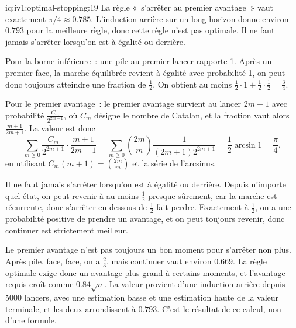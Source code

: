 \begin{solution}{iq:iv1:optimal-stopping:19}
La règle «~s'arrêter au premier avantage~» vaut exactement $\pi/4 \approx 0.785$. L'induction arrière sur un long horizon donne environ $0.793$ pour la meilleure règle, donc cette règle n'est pas optimale. Il ne faut jamais s'arrêter lorsqu'on est à égalité ou derrière.

Pour la borne inférieure~: une pile au premier lancer rapporte 1. Après un premier face, la marche équilibrée revient à égalité avec probabilité 1, on peut donc toujours atteindre une fraction de $\tfrac12$. On obtient au moins $\tfrac12 \cdot 1 + \tfrac12 \cdot \tfrac12 = \tfrac34$.

Pour le premier avantage~: le premier avantage survient au lancer $2m + 1$ avec probabilité $\frac{C_m}{2^{2m + 1}}$, où $C_m$ désigne le nombre de Catalan, et la fraction vaut alors $\frac{m + 1}{2m + 1}$. La valeur est donc
\[
\sum_{m \ge 0} \frac{C_m}{2^{2m + 1}} \cdot \frac{m + 1}{2m + 1} = \sum_{m \ge 0} \binom{2m}{m}\frac{1}{(2m + 1)2^{2m + 1}} = \frac12 \arcsin 1 = \frac{\pi}{4},
\]
en utilisant $C_m(m + 1) = \binom{2m}{m}$ et la série de l'arcsinus.

Il ne faut jamais s'arrêter lorsqu'on est à égalité ou derrière. Depuis n'importe quel état, on peut revenir à au moins $\tfrac12$ presque sûrement, car la marche est récurrente, donc s'arrêter en dessous de $\tfrac12$ fait perdre. Exactement à $\tfrac12$, on a une probabilité positive de prendre un avantage, et on peut toujours revenir, donc continuer est strictement meilleur.

Le premier avantage n'est pas toujours un bon moment pour s'arrêter non plus. Après pile, face, face, on a $\tfrac23$, mais continuer vaut environ $0.669$. La règle optimale exige donc un avantage plus grand à certains moments, et l'avantage requis croît comme $0.84\sqrt{n}$. La valeur provient d'une induction arrière depuis 5000 lancers, avec une estimation basse et une estimation haute de la valeur terminale, et les deux arrondissent à $0.793$. C'est le résultat de ce calcul, non d'une formule.

\end{solution}

